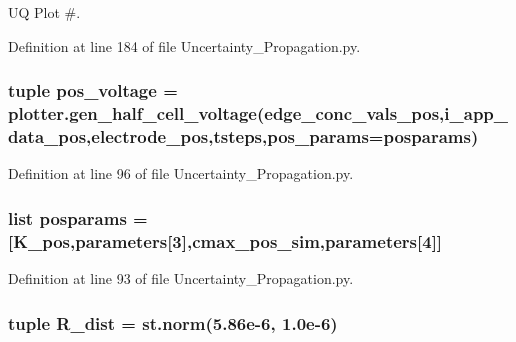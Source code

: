 U\-Q Plot \#. 



Definition at line 184 of file Uncertainty\-\_\-\-Propagation.\-py.

\hypertarget{namespace_uncertainty___propagation_a7216b88d41d69db8e4728dc6e9951a87}{
\subsubsection[{pos\-\_\-voltage}]{\setlength{\rightskip}{0pt plus 5cm}tuple pos\-\_\-voltage = {\bf plotter.\-gen\-\_\-half\-\_\-cell\-\_\-voltage}({\bf edge\-\_\-conc\-\_\-vals\-\_\-pos},{\bf i\-\_\-app\-\_\-data\-\_\-pos},electrode\-\_\-pos,tsteps,pos\-\_\-params={\bf posparams})}}\label{namespace_uncertainty___propagation_a7216b88d41d69db8e4728dc6e9951a87}


Definition at line 96 of file Uncertainty\-\_\-\-Propagation.\-py.

\hypertarget{namespace_uncertainty___propagation_a073ee030b3fea2b1f15194fee942060b}{
\subsubsection[{posparams}]{\setlength{\rightskip}{0pt plus 5cm}list posparams = \mbox{[}K\-\_\-pos,{\bf parameters}\mbox{[}3\mbox{]},cmax\-\_\-pos\-\_\-sim,{\bf parameters}\mbox{[}4\mbox{]}\mbox{]}}}\label{namespace_uncertainty___propagation_a073ee030b3fea2b1f15194fee942060b}


Definition at line 93 of file Uncertainty\-\_\-\-Propagation.\-py.

\hypertarget{namespace_uncertainty___propagation_ac07f0a77ab7492fb7046054192039280}{
\subsubsection[{R\-\_\-dist}]{\setlength{\rightskip}{0pt plus 5cm}tuple R\-\_\-dist = st.\-norm(5.\-86e-\/6, 1.\-0e-\/6)}}\label{namespace_uncertainty___propagation_ac07f0a77ab7492fb7046054192039280}


